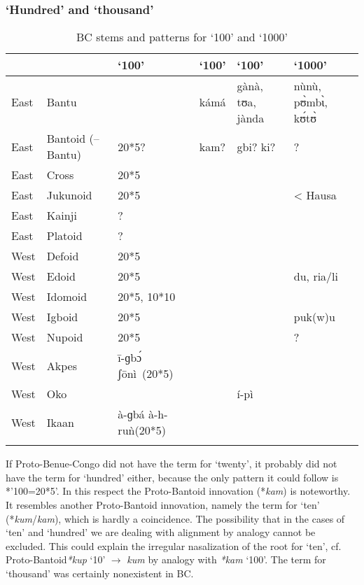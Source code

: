 \clearpage
\subsubsection{‘Hundred’ and ‘thousand’}\label{sec:3.1.4.10}
\begin{table}
\caption{\label{tab:3:63}BC stems and patterns for `100'  and `1000'}


\begin{tabularx}{\textwidth}{lQ QllQ}
\lsptoprule

~ & \textbf{~} & `100' & `100' & `100' & `1000' \\
\midrule
East & {Bantu} &   & kámá & gànà, tʊa, jànda & nùnù, p{\`{ʊ}}mb{\`{ɩ}}, k{\'{ʊ}}t{\`{ʊ}}\\
East & {Bantoid} {(–Bantu)} & 20*5? & kam? & gbi? ki? &?\\
East & {Cross} & 20*5 &   &   &  \\
East & {Jukunoid} & 20*5 &   &   & < Hausa\\
East & {Kainji} & ? &   &   &  \\
East & {Platoid} & ? &   &   &  \\
West & {Defoid} & 20*5 &   &   &  \\
West & {Edoid} & 20*5 &   &   & du, ria/li\\
West & {Idomoid} & 20*5, 10*10 &   &   &  \\
West & {Igboid} & 20*5 &   &   & puk(w)u\\
West & {Nupoid} & 20*5 &   &   & ?\\
West & {Akpes} & ī-ɡb{\'{ɔ}} ʃōnì~(20*5) &   &   &  \\
West & {Oko} &   &   & í-pì &  \\
West & {Ikaan} & à-ɡbá à-h-ruǹ(20*5) &   &   &  \\
\lspbottomrule
\end{tabularx}
\end{table}

If Proto-Benue-Congo did not have the term for ‘twenty’, it probably did not have the term for ‘hundred’ either, because the only pattern it could follow is *’100=20*5’. In this respect the Proto-Bantoid innovation (*\textit{kam}) is noteworthy. It resembles another Proto-Bantoid innovation, namely the term for ‘ten’ (*\textit{kum}/\textit{kam}), which is hardly a coincidence. The possibility that in the cases of ‘ten’ and ‘hundred’ we are dealing with alignment by analogy cannot be excluded. This could explain the irregular nasalization of the root for ‘ten’, cf. Proto-Bantoid\textit{*kup} ‘10’ ${\rightarrow}$ \textit{kum} by analogy with \textit{*kam} ‘100’.
The term for ‘thousand’ was certainly nonexistent in BC.

